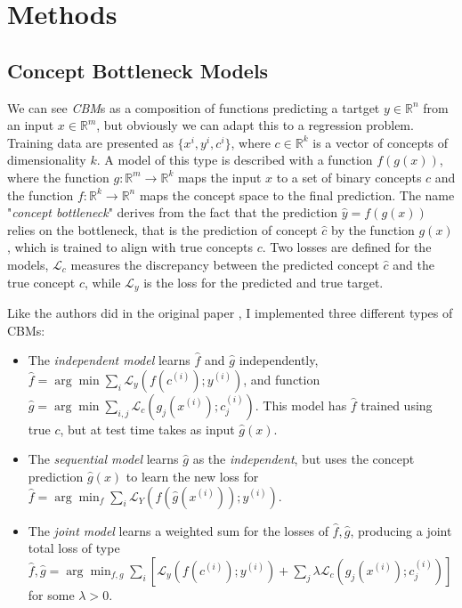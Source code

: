 \documentclass[10pt, twocolumn, letterpaper]{article}
\begin{document}
\section{Methods}
\subsection{Concept Bottleneck Models}
We can see \textit{CBM}s as a composition of functions predicting a tartget $ y \in \mathbb{R}^n$ from an input $ x \in \mathbb{R}^m $, but obviously we can adapt this to a regression problem. Training data are presented as $ \{x^{i}, y^{i}, c^{i}\}$, where $c \in \mathbb{R}^k $ is a vector of concepts of dimensionality $k$. A model of this type is described with a function $f(g(x))$, where the function $g : \mathbb{R}^m \rightarrow \mathbb{R}^k $ maps the input $x$ to a set of binary concepts $c$ and the function $f : \mathbb{R}^k \rightarrow \mathbb{R}^n$ maps the concept space to the final prediction. The name "\textit{concept bottleneck}" derives from the fact that the prediction $\hat{y} = f(g(x))$ relies on the bottleneck, that is the prediction of concept $\hat{c}$ by the function $g(x)$, which is trained to align with true concepts $c$. Two losses are defined for the models, $\mathcal{L}_{c}$ measures the discrepancy between the predicted concept $\hat{c}$ and the true concept $c$, while $\mathcal{L}_{y}$ is the loss for the predicted and true target.

Like the authors did in the original paper \cite{koh2020concept}, I implemented three different types of CBMs: \begin{itemize}
    \item The \textit{independent model} learns $\hat{f}$ and $\hat{g}$ independently, $\hat{f} = \arg\min \sum_{i}^{} \mathcal{L}_{y} (f(c^{(i)});y^{(i)}) $, and function $\hat{g} = \arg\min \sum_{i,j}^{} \mathcal{L}_{c}(g_{j}(x^{(i)}); c_{j}^{(i)})$. This model has $\hat{f}$ trained using true $c$, but at test time takes as input $\hat{g}(x)$.
    \item The \textit{sequential model} learns $\hat{g}$ as the \textit{independent}, but uses the concept prediction $\hat{g}(x)$ to learn the new loss for $\hat{f} = \arg\min_{f} \sum_{i}^{} \mathcal{L}_{Y} (f(\hat{g}(x^{(i)})); y^{(i)})$.
    \item The \textit{joint model} learns a weighted sum for the losses of $\hat{f},\hat{g}$, producing a joint total loss of type $\hat{f}, \hat{g} = \arg\min_{f,g} \sum_{i}^{}[\mathcal{L}_{y} (f(c^{(i)});y^{(i)}) + \sum_{j}^{} \lambda \mathcal{L}_{c}(g_{j}(x^{(i)}); c_{j}^{(i)})]$ for some $\lambda > 0$.
\end{itemize}
\end{document}
